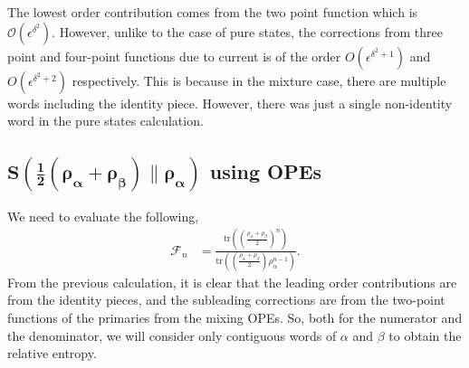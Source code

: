 \documentclass[11pt]{article}
\newcommand{\ep}{\epsilon}
\newcommand{\mO}{\mathcal{O}}
\newcommand{\lb}{\left(}
\newcommand{\rb}{\right)}
\begin{document}
The lowest order contribution comes from the two point function which is $\mO(\ep^{\delta^2})$. However, unlike to the case of pure states, the corrections from three point and four-point functions due to current is of the order $O(\ep^{\delta^2+1})$ and $O(\ep^{\delta^2+2})$ respectively. This is because in the mixture case, there are multiple words including the identity piece. However, there was just a single non-identity word in the pure states calculation.
\subsection{\texorpdfstring{$\boldsymbol{S\lb\frac{1}{2}\lb \rho_\alpha + \rho_\beta\rb  \| \rho_\alpha\rb }$ using OPEs}{S(half rho alpha plus half rho beta wrt half rho alpha) using OPEs}}
We need to evaluate the following,
\begin{align}
    \mathcal{F}_n &= \frac{\text{tr}\lb\lb \frac{ \rho_\alpha + \rho_\beta}{2}\rb^n\rb}{\text{tr}\lb \lb \frac{\rho_\alpha + \rho_\beta}{2}\rb \rho_\alpha^{n-1} \rb}.
\end{align}
From the previous calculation, it is clear that the leading order contributions are from the identity pieces, and the subleading corrections are from the two-point functions of the primaries from the mixing OPEs. So, both for the numerator and the denominator, we will consider only contiguous words of $\alpha$ and $\beta$ to obtain the relative entropy. 
\end{document}
